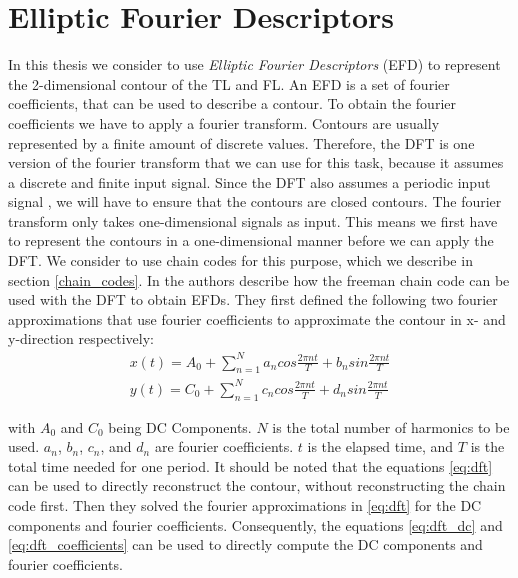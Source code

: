 \documentclass[thesis.tex]{subfiles}
\begin{document}
\section{Elliptic Fourier Descriptors} \label{elliptic_fourier_descriptors}
In this thesis we consider to use \textit{Elliptic Fourier Descriptors} (EFD) \cite{giardinia} to represent the 2-dimensional contour of the TL and FL. An EFD is a set of fourier coefficients, that can be used to describe a contour. To obtain the fourier coefficients we have to apply a fourier transform. Contours are usually represented by a finite amount of discrete values. Therefore, the DFT is one version of the fourier transform that we can use for this task, because it assumes a discrete and finite input signal. Since the DFT also assumes a periodic input signal \cite{dspguide}, we will have to ensure that the contours are closed contours. The fourier transform only takes one-dimensional signals as input. This means we first have to represent the contours in a one-dimensional manner before we can apply the DFT. We consider to use chain codes for this purpose, which we describe in section \ref{chain_codes}. In \cite{giardinia} the authors describe how the freeman chain code can be used with the DFT to obtain EFDs. They first defined the following two fourier approximations that use fourier coefficients to approximate the contour in x- and y-direction respectively:
\begin{equation} \label{eq:dft}
\begin{split}
 x(t) = A_0 + \sum_{n=1}^{N} a_n cos \frac{2\pi n t}{T} + b_n sin \frac{2\pi n t}{T} \\
 y(t) = C_0 + \sum_{n=1}^{N} c_n cos \frac{2\pi n t}{T} + d_n sin \frac{2\pi n t}{T}
\end{split}
\end{equation}

with $ A_0$ and $C_0 $ being DC Components. $N$ is the total number of harmonics to be used. $a_n$, $b_n$, $c_n$, and $d_n$ are fourier coefficients. $t$ is the elapsed time, and $T$ is the total time needed for one period. It should be noted that the equations \ref{eq:dft} can be used to directly reconstruct the contour, without reconstructing the chain code first. 
Then they solved the fourier approximations in \ref{eq:dft} for the DC components and fourier coefficients. Consequently, the equations \ref{eq:dft_dc} and \ref{eq:dft_coefficients} can be used to directly compute the DC components and fourier coefficients. 
\end{document}
